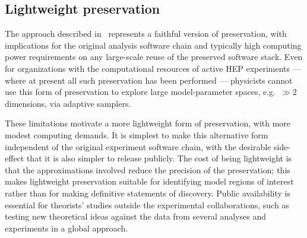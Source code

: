 \documentclass[11pt]{article}
\begin{document}





\subsection{Lightweight preservation}
\label{lightweight}

The approach described in~ represents a faithful version of preservation, with implications for the original analysis software chain and typically high computing power requirements on any large-scale reuse of the preserved software stack. Even for organizations with the computational resources of active \gls{HEP} experiments --- where at present all such preservation has been performed --- physicists cannot use this form of preservation to explore large model-parameter spaces, e.g.~$\gg 2$ dimensions, via adaptive samplers.

These limitations motivate a more lightweight form of preservation, with more modest computing demands. It is simplest to make this alternative form independent of the original experiment software chain, with the desirable side-effect that it is also simpler to release publicly. The cost of being lightweight is that the approximations involved reduce the precision of the preservation; this makes lightweight preservation suitable for identifying model regions of interest rather than for making definitive statements of discovery. Public availability is essential for theorists' studies outside the experimental collaborations, such as testing new theoretical ideas against the data from several analyses and experiments in a global approach.
\end{document}
